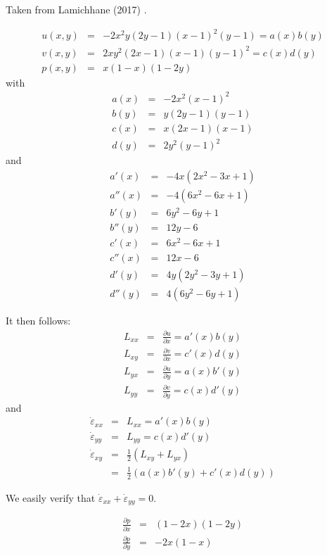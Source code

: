 
Taken from Lamichhane (2017) \cite{lami17}.

\begin{eqnarray}
u(x,y)&=&-2x^2y(2y-1)(x-1)^2(y-1) = a(x)b(y)\\
v(x,y)&=& 2xy^2(2x-1)(x-1)(y-1)^2 = c(x)d(y)\\
p(x,y)&=& x(1-x)(1-2y)
\end{eqnarray}
with
\begin{eqnarray}
a(x)&=&-2x^2(x-1)^2  \\
b(y)&=& y(2y-1)(y-1) \\ 
c(x)&=& x(2x-1)(x-1) \\
d(y)&=& 2y^2(y-1)^2
\end{eqnarray}
and 
\begin{eqnarray}
a'(x) &=&  -4x(2x^2-3x+1)\\
a''(x)&=&  -4(6x^2-6x+1) \\
b'(y) &=&  6y^2-6y+1 \\
b''(y)&=&  12y-6 \\
c'(x) &=& 6x^2-6x+1 \\
c''(x)&=& 12x-6  \\
d'(y) &=& 4y(2y^2-3y+1)  \\
d''(y)&=&  4(6y^2-6y+1)  
\end{eqnarray}

It then follows:
\begin{eqnarray}
{L}_{xx} &=& \frac{\partial u}{\partial x} =a'(x) b(y)\\ 
{L}_{xy} &=& \frac{\partial v}{\partial x} =c'(x) d(y)\\
{L}_{yx} &=& \frac{\partial u}{\partial y} =a(x) b'(y)\\
{L}_{yy} &=& \frac{\partial v}{\partial y} =c(x) d'(y)
\end{eqnarray}
and
\begin{eqnarray}
\dot{\varepsilon}_{xx} &=& L_{xx} = a'(x) b(y) \\
\dot{\varepsilon}_{yy} &=& L_{yy} = c(x) d'(y) \\
\dot{\varepsilon}_{xy} 
&=& \frac{1}{2} (L_{xy}+L_{yx}) \\
&=& \frac{1}{2} ( a(x) b'(y) +  c'(x) d(y)   ) 
\end{eqnarray}

We easily verify that $\dot{\varepsilon}_{xx}+\dot{\varepsilon}_{yy}=0$.

\begin{eqnarray}
\frac{\partial p}{\partial x} &=& (1-2x)(1-2y)\\
\frac{\partial p}{\partial y} &=& -2 x(1-x) 
\end{eqnarray}

